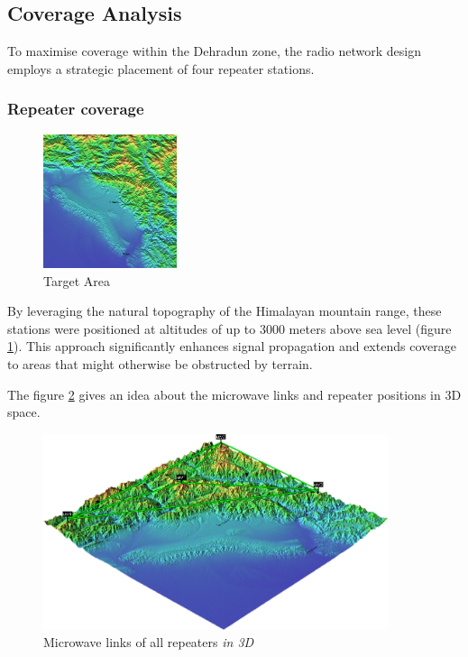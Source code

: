 \subsection{Coverage Analysis}
To maximise coverage within the Dehradun zone, the radio network design employs a strategic placement of four repeater stations.
\subsubsection{Repeater coverage}

\begin{figure}
    \vspace{-5mm}
    \centering
    \includegraphics[width=0.35\textwidth]{Images/Dehradun, UK, IND.png}
    \caption{\small Target Area}
    \label{fig:TgrtDDN}
\end{figure}

By leveraging the natural topography of the Himalayan mountain range, these stations were positioned at altitudes of up to 3000 meters above sea level (figure \ref{fig:TgrtDDN}).
This approach significantly enhances signal propagation and extends coverage to areas that might otherwise be obstructed by terrain.

The figure \ref{fig:3Dpic} gives an idea about the microwave links and repeater positions in 3D space.
\begin{figure}[h!]
    \vspace{7mm}
    \centering
    \includegraphics[width=0.9\textwidth]{Images/3D network.png}
    \caption{Microwave links of all repeaters \textit{in 3D}}
    \label{fig:3Dpic}
\end{figure}

